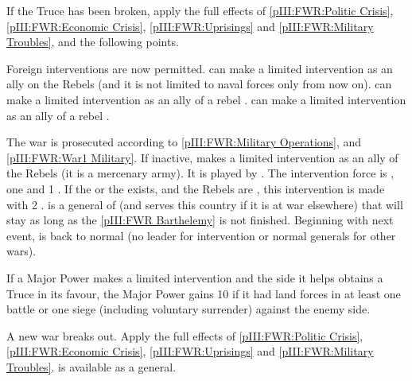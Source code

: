\begin{digressions}
  \phadm
  \aparag If the Truce has been broken, apply the full effects of
  \ref{pIII:FWR:Politic Crisis}, \ref{pIII:FWR:Economic Crisis},
  \ref{pIII:FWR:Uprisings} and \ref{pIII:FWR:Military Troubles}, and the
  following points.

  \phdipl
  \aparag Foreign interventions are now permitted.
  \aparag \REB can make a limited intervention as an ally on the Rebels (and
  it is not limited to naval forces only from now on).
  \aparag \HOL can make a limited intervention as an ally of a rebel \hug.
  \aparag \SPA can make a limited intervention as an ally of a rebel \lig.

  \phmil
  \aparag The war is prosecuted according to \ref{pIII:FWR:Military
    Operations}, and \ref{pIII:FWR:War1 Military}.
   If inactive, \paysPalatinat makes a
  limited intervention as an ally of the Rebels (it is a mercenary army). It
  is played by \REB. The intervention force is , one
  \ARMY \faceplus and 1 \DT.  If the  or the
   exists, and the Rebels are \hug, this
  intervention is made with 2 \ARMY \faceplus.   is a
  general of \paysPalatinat (and serves this country if it is at war
  elsewhere) that will stay as long as the \ref{pIII:FWR Barthelemy} is not
  finished. Beginning with next event, \paysPalatinat is back to normal (no
  leader for intervention or normal generals for other wars).

  \phpaix
  \aparag If a Major Power makes a limited intervention and the side it helps
  obtains a Truce in its favour, the Major Power gains 10 \PV if it had land
  forces in at least one battle or one siege (including voluntary surrender)
  against the enemy side.

\end{digressions}





\phevnt
\aparag A new war breaks out. Apply the full effects of \ref{pIII:FWR:Politic
  Crisis}, \ref{pIII:FWR:Economic Crisis}, \ref{pIII:FWR:Uprisings} and
\ref{pIII:FWR:Military Troubles}.
\aparag \leaderNavarre is available as a \paysHuguenots general.

